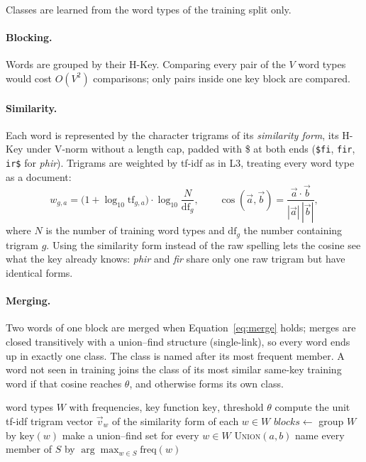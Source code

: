 Classes are learned from the word types of the training split only.

\paragraph{Blocking.} Words are grouped by their H-Key. Comparing every pair of the $V$ word types
would cost $O(V^2)$ comparisons; only pairs inside one key block are compared.

\paragraph{Similarity.} Each word is represented by the character trigrams of its
\emph{similarity form}, its H-Key under V-norm without a length cap, padded with \$ at both ends
(\texttt{\$fi}, \texttt{fir}, \texttt{ir\$} for \textit{phir}). Trigrams are weighted by tf-idf as
in L3, treating every word type as a document:
\begin{equation}
w_{g,a}=\bigl(1+\log_{10}\mathrm{tf}_{g,a}\bigr)\cdot\log_{10}\frac{N}{\mathrm{df}_g},
\qquad
\cos(\vec a,\vec b)=\frac{\vec a\cdot\vec b}{|\vec a|\,|\vec b|},
\end{equation}
where $N$ is the number of training word types and $\mathrm{df}_g$ the number containing trigram
$g$. Using the similarity form instead of the raw spelling lets the cosine see what the key already
knows: \textit{phir} and \textit{fir} share only one raw trigram but have identical forms.

\paragraph{Merging.} Two words of one block are merged when Equation~\ref{eq:merge} holds; merges
are closed transitively with a union--find structure (single-link), so every word ends up in exactly
one class. The class is named after its most frequent member. A word not seen in training joins the
class of its most similar same-key training word if that cosine reaches $\theta$, and otherwise
forms its own class.

\begin{algorithm}[t]
\caption{Learning variant classes from the training word types}
\label{alg:variants}
\begin{algorithmic}[1]
\Require word types $W$ with frequencies, key function $\mathrm{key}$, threshold $\theta$
\State compute the unit tf-idf trigram vector $\vec v_w$ of the similarity form of each $w\in W$
\State $\mathit{blocks}\gets$ group $W$ by $\mathrm{key}(w)$
\State make a union--find set for every $w\in W$
     \textsc{Union}$(a,b)$ \EndIf
  \EndFor
\EndFor
{} name every member of $S$ by $\arg\max_{w\in S}\mathrm{freq}(w)$ \EndFor
\end{algorithmic}
\end{algorithm}

